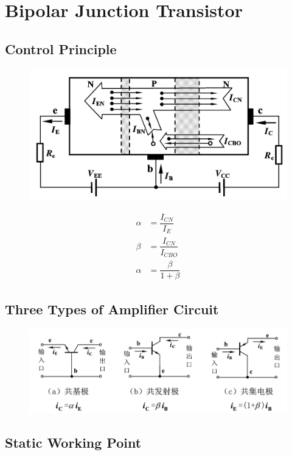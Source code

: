 \chapter{Bipolar Junction Transistor}

\section{Control Principle}

\begin{figure}[H]
  \centering
  \includegraphics[width=0.5\linewidth]{figures/BJT-control-principle}
  \label{fig:}
\end{figure}

\begin{equation*}
  \begin{aligned}
    \alpha &= \dfrac{I_{CN}}{I_E} \\
    \beta &= \dfrac{I_{CN}}{I_{CBO}} \\
    \alpha &= \dfrac{\beta}{1 + \beta} 
  \end{aligned}
\end{equation*}

\section{Three Types of Amplifier Circuit}

\begin{figure}[H]
  \centering
  \includegraphics[width=0.9\linewidth]{figures/BJT-three-types}
  \label{fig:}
\end{figure}

\section{Static Working Point}

